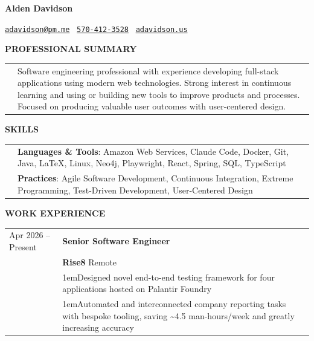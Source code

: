 \documentclass[11pt]{article}
\newlength{\dateColumnWidth}
\newcommand{\customBulletLabel}{\raisebox{0.4ex}{\tiny$\bullet$}}
\newcommand{\detail}{\par\noindent\makebox[1em][l]{\customBulletLabel}\hangindent1em}
\newcommand{\sectionHeader}[1]{{\Large \textbf{#1}}\xhrulefill{black!60}{3pt}\bigbreak}
\begin{document}
\begin{center}
	\begin{minipage}{0.70\textwidth}
		{\Huge\textbf{Alden Davidson}}
	\end{minipage}%
	\begin{minipage}{0.30\textwidth}
		\raggedleft
		\href{mailto:adavidson@pm.me}{\nolinkurl{adavidson@pm.me}}~
		\href{tel:5704123528}{\nolinkurl{570-412-3528}}~
		\href{https://adavidson.us}{\nolinkurl{adavidson.us}}~
	\end{minipage}
\end{center}
\sectionHeader{PROFESSIONAL SUMMARY}
\begin{tabularx}{\textwidth}{@{}p{\dateColumnWidth}X@{}}
	 & Software engineering professional with experience developing full-stack applications using modern web technologies.
	Strong interest in continuous learning and using or building new tools to improve products and processes.
	Focused on producing valuable user outcomes with user-centered design.
\end{tabularx}
\bigbreak
\sectionHeader{SKILLS}
\begin{tabularx}{\textwidth}{@{}p{\dateColumnWidth}X@{}}
	& \textbf{Languages \& Tools}: Amazon Web Services, Claude Code, Docker, Git, Java, \LaTeX, Linux, Neo4j, Playwright, React, Spring, SQL, TypeScript	\\
	& \textbf{Practices}: Agile Software Development, Continuous Integration, Extreme Programming, Test-Driven Development, User-Centered Design			\\
\end{tabularx}
\bigbreak
\sectionHeader{WORK EXPERIENCE}
\begin{tabularx}{\textwidth}{@{}p{\dateColumnWidth}X@{}}
	Apr 2026 -- Present & \textbf{Senior Software Engineer}																																\\
						& \textbf{Rise8} \textbar{} Remote																																\\
						& \detail Designed novel end-to-end testing framework for four applications hosted on Palantir Foundry															\\
						& \detail Automated and interconnected company reporting tasks with bespoke tooling, saving \textasciitilde4.5 man-hours/week and greatly increasing accuracy	\\
\end{tabularx}
\end{document}

